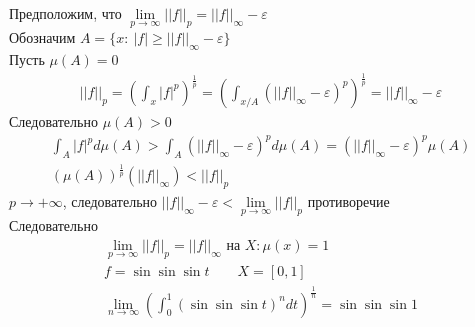 	\vskip 0.2in
	Предположим, что $\lim\limits_{p \to \infty}||f||_p = ||f||_{\infty} - \varepsilon$\\
	Обозначим $A = \{x:\ |f| \geqslant ||f||_{\infty} - \varepsilon\}$\\
	Пусть $\mu(A) = 0$
	\begin{gather*}
		||f||_p = (\int_{x} |f|^p)^{\frac{1}{p}} = (\int_{x \slash A} (||f||_{\infty} - \varepsilon)^p)^{\frac{1}{p}} = ||f||_{\infty} - \varepsilon
	\end{gather*}
	Следовательно $\mu(A) > 0$
	\begin{gather*}
		\int_{A} |f|^{p}d \mu(A) > \int_{A}(||f||_{\infty} - \varepsilon)^p d \mu (A) = (||f||_{\infty} - \varepsilon)^p \mu(A)\\
		(\mu(A))^{\frac{1}{p}}(||f||_{\infty}) < ||f||_p
	\end{gather*}
	$p \to +\infty$, следовательно $||f||_{\infty} - \varepsilon < \lim\limits_{p \to \infty} ||f||_p$ противоречие\\
	Следовательно
	\begin{gather*}
		\lim\limits_{p \to \infty} ||f||_p = ||f||_{\infty} \text{ на } X: \mu(x) = 1\\
		f = \sin\sin\sin t\qquad X = [0,1]\\
		\lim\limits_{n \to \infty} (\int_{0}^{1} (\sin\sin\sin t)^n dt)^{\frac{1}{n}} = \sin\sin\sin 1
	\end{gather*}
	\vskip0.5in


